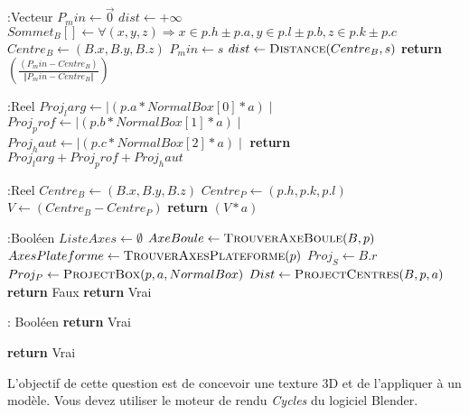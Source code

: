 \documentclass[12pt,addpoints]{exam}
\begin{document}
\begin{questions}
\begin{solution}
\begin{algorithmic}[3]
 :Vecteur
  \State $P_min \gets \overrightarrow{0}$
  \State $dist \gets +\infty$
  \State $Sommet_B[] \gets \forall (x,y,z) \Rightarrow x \in p.h \pm p.a, y \in p.l \pm p.b , z \in p.k \pm p.c$
  \State $Centre_B \gets (B.x, B.y, B.z)$
      \State $P_min \gets s$
      \State $dist \gets \Call{Distance}{Centre_B, s}$ 
    \EndIf
  \EndFor
  \State \textbf{return} $ \left( \frac{(P_min - Centre_B)}{\Vert P_min - Centre_B \Vert} \right)$
 \EndFunction

 :Reel
  \State $Proj_larg \gets \mid (p.a * NormalBox[0] * a) \mid $
  \State $Proj_prof \gets \mid (p.b * NormalBox[1] * a) \mid $
  \State $Proj_haut \gets \mid (p.c * NormalBox[2] * a) \mid $
  \State \textbf{return} $ Proj_larg + Proj_prof + Proj_haut $
 \EndFunction

 :Reel
  \State $Centre_B \gets (B.x, B.y, B.z)$
  \State $Centre_P \gets (p.h, p.k, p.l)$
  \State $V \gets (Centre_B - Centre_P)$
  \State \textbf{return} $ (V * a) $
 \EndFunction

 :Booléen
  \State $ListeAxes \gets \emptyset$
  \State $AxeBoule \gets \Call{TrouverAxeBoule}{B,p} $
  \State $AxesPlateforme \gets \Call{TrouverAxesPlateforme}{p} $
  \State {}
  \State {}
    \State $ Proj_S \gets B.r $
    \State $ Proj_P \gets \Call{ProjectBox}{p,a,NormalBox} $
    \State $ Dist \gets \Call{ProjectCentres}{B,p,a} $
      \State \textbf{return} Faux
    \EndIf 
  \EndFor
  \State \textbf{return} Vrai
 \EndFunction

  : Booléen
       \State \textbf{return} Vrai
    \EndIf
  \EndFor

    \State \textbf{return} Vrai
  \EndIf
 \EndFunction

 \end{algorithmic}
\end{solution}

\question
L'objectif de cette question est de concevoir une texture 3D et de l'appliquer à un modèle. Vous devez utiliser le moteur de rendu \emph{Cycles} du logiciel Blender.
\begin{parts}

\end{parts}
\end{questions}
\end{document}
